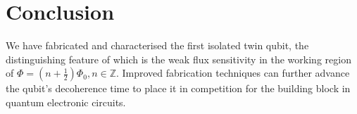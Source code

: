 \section{Conclusion}
\noindent We have fabricated and characterised the first isolated twin qubit, the
distinguishing feature of which is the weak flux sensitivity in the working region of
$ \Phi = (n+\frac{1}{2})\Phi_0, n\in\mathbb{Z} $. Improved fabrication techniques can further advance
the qubit's decoherence time to place it in competition for the building block in quantum
electronic circuits.


\noindent 
